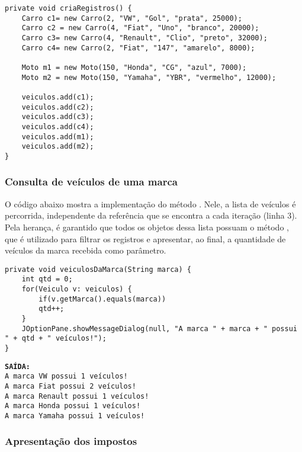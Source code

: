 \begin{verbatim}
private void criaRegistros() {
	Carro c1= new Carro(2, "VW", "Gol", "prata", 25000);
	Carro c2 = new Carro(4, "Fiat", "Uno", "branco", 20000);
	Carro c3= new Carro(4, "Renault", "Clio", "preto", 32000);
	Carro c4= new Carro(2, "Fiat", "147", "amarelo", 8000);

	Moto m1 = new Moto(150, "Honda", "CG", "azul", 7000);
	Moto m2 = new Moto(150, "Yamaha", "YBR", "vermelho", 12000);

	veiculos.add(c1);
	veiculos.add(c2);
	veiculos.add(c3);
	veiculos.add(c4);
	veiculos.add(m1);
	veiculos.add(m2);
}
\end{verbatim}

\subsubsection{Consulta de veículos de uma marca}

O código abaixo mostra a implementação do método . Nele, a lista de veículos é percorrida, independente da referência que se encontra a cada iteração (linha 3). Pela herança, é garantido que todos os objetos dessa lista possuam o método , que é utilizado para filtrar os registros e apresentar, ao final, a quantidade de veículos da marca recebida como parâmetro.

\begin{verbatim}
private void veiculosDaMarca(String marca) {
	int qtd = 0;
	for(Veiculo v: veiculos) {
		if(v.getMarca().equals(marca))
		qtd++;
	}
	JOptionPane.showMessageDialog(null, "A marca " + marca + " possui " + qtd + " veículos!");
}
\end{verbatim}

\begin{minipage}{\textwidth}
	\textbf{\texttt{SAÍDA:}}\\
	\texttt{A marca VW possui 1 veículos!}\\
	\texttt{A marca Fiat possui 2 veículos!}\\
	\texttt{A marca Renault possui 1 veículos!}\\
	\texttt{A marca Honda possui 1 veículos!}\\
	\texttt{A marca Yamaha possui 1 veículos!}
\end{minipage}

\subsubsection{Apresentação dos impostos}

